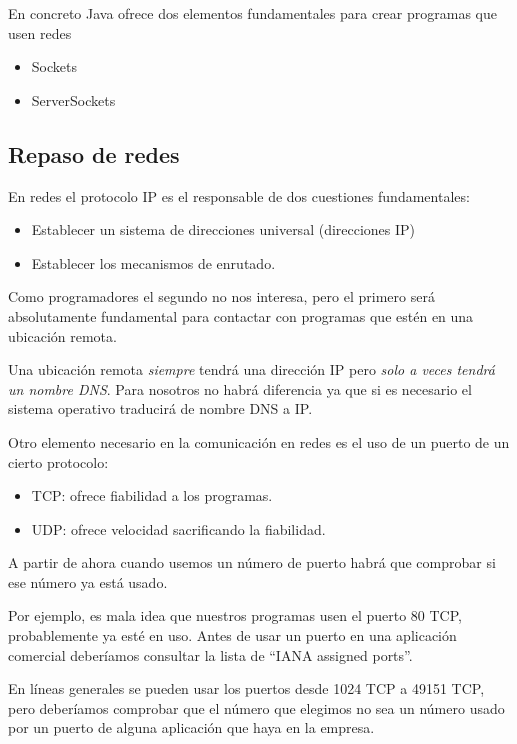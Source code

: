 \documentclass[a4paper,12pt,spanish]{sphinxmanual}
\begin{document}
En concreto Java ofrece dos elementos fundamentales para crear programas que usen redes
\begin{itemize}
\item {} 
Sockets

\item {} 
ServerSockets

\end{itemize}


\subsection{Repaso de redes}
\label{textos/tema3:repaso-de-redes}
En redes el protocolo IP es el responsable de dos cuestiones fundamentales:
\begin{itemize}
\item {} 
Establecer un sistema de direcciones universal (direcciones IP)

\item {} 
Establecer los mecanismos de enrutado.

\end{itemize}

Como programadores el segundo no nos interesa, pero el primero será absolutamente fundamental para contactar con programas que estén en una ubicación remota.

Una ubicación remota \emph{siempre} tendrá una dirección
IP pero \emph{solo a veces tendrá un nombre DNS}. Para nosotros no habrá diferencia ya que si es necesario el sistema operativo traducirá de nombre DNS a IP.

Otro elemento necesario en la comunicación en redes es el uso de un puerto de un cierto protocolo:
\begin{itemize}
\item {} 
TCP: ofrece fiabilidad a los programas.

\item {} 
UDP: ofrece velocidad sacrificando la fiabilidad.

\end{itemize}

A partir de ahora cuando usemos un número de puerto habrá que comprobar si ese número ya está usado.

Por ejemplo, es mala idea que nuestros programas usen el puerto 80 TCP, probablemente ya esté en uso.
Antes de usar un puerto en una aplicación comercial deberíamos consultar la lista de ``IANA assigned ports''.

En líneas generales se pueden usar los puertos desde 1024 TCP a 49151 TCP, pero deberíamos comprobar que el número que elegimos no sea un número usado por un puerto de alguna aplicación que haya en la empresa.
\end{document}
